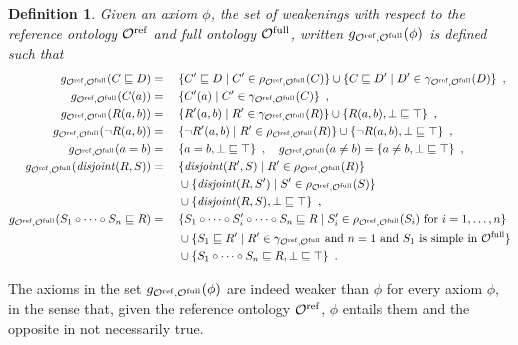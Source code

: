 \documentclass[
]{ceurart}
\newtheorem{definition}{Definition}
\newtheorem{example}{Example}
\begin{document}
\begin{definition}
  Given an axiom $\phi$, the set of \emph{weakenings} with respect to the reference ontology ${\mathcal{O}^\textnormal{ref}}$ and full ontology ${\mathcal{O}^\textnormal{full}}$, written $g_{{\mathcal{O}^\textnormal{ref}},{\mathcal{O}^\textnormal{full}}}(\phi)$ is defined such that
  \begin{alignat*}{2}
    g_{{\mathcal{O}^\textnormal{ref}},{\mathcal{O}^\textnormal{full}}}(C \sqsubseteq D) &={} &&\{ C' \sqsubseteq D \mid C' \in \rho_{{\mathcal{O}^\textnormal{ref}},{\mathcal{O}^\textnormal{full}}} (C) \} \cup \{ C \sqsubseteq D' \mid D' \in \gamma_{{\mathcal{O}^\textnormal{ref}},{\mathcal{O}^\textnormal{full}}}(D) \} \enspace, \\
    g_{{\mathcal{O}^\textnormal{ref}},{\mathcal{O}^\textnormal{full}}}(C(a)) &={} && \{ C'(a) \mid C' \in \gamma_{{\mathcal{O}^\textnormal{ref}},{\mathcal{O}^\textnormal{full}}}(C) \} \enspace, \\
    g_{{\mathcal{O}^\textnormal{ref}},{\mathcal{O}^\textnormal{full}}}(R(a, b)) &={} && \{ R'(a, b) \mid R' \in \gamma_{{\mathcal{O}^\textnormal{ref}},{\mathcal{O}^\textnormal{full}}}(R) \} \cup \{ R(a, b), \bot \sqsubseteq \top \} \enspace, \\
    g_{{\mathcal{O}^\textnormal{ref}},{\mathcal{O}^\textnormal{full}}}(\lnot R(a, b)) &={} && \{ \lnot R'(a, b) \mid R' \in \rho_{{\mathcal{O}^\textnormal{ref}},{\mathcal{O}^\textnormal{full}}}(R) \} \cup \{ \lnot R(a, b), \bot \sqsubseteq \top \} \enspace, \\
    g_{{\mathcal{O}^\textnormal{ref}},{\mathcal{O}^\textnormal{full}}}(a = b) &={} && \{ a = b, \bot \sqsubseteq \top \} \enspace,
    \quad g_{{\mathcal{O}^\textnormal{ref}},{\mathcal{O}^\textnormal{full}}}(a \not= b) = \{ a \not= b, \bot \sqsubseteq \top \} \enspace, \\
    g_{{\mathcal{O}^\textnormal{ref}},{\mathcal{O}^\textnormal{full}}}(\mathit{disjoint}(R, S)) &={} &&\{ \mathit{disjoint}(R', S) \mid R' \in \rho_{{\mathcal{O}^\textnormal{ref}},{\mathcal{O}^\textnormal{full}}} (R) \} \\
    &&& \cup \{ \mathit{disjoint}(R, S') \mid S' \in \rho_{{\mathcal{O}^\textnormal{ref}},{\mathcal{O}^\textnormal{full}}}(S) \} \\
    &&& \cup \{ \mathit{disjoint} (R, S), \bot \sqsubseteq \top \} \enspace, \\
    g_{{\mathcal{O}^\textnormal{ref}},{\mathcal{O}^\textnormal{full}}}(S_1 \circ \cdots \circ S_n \sqsubseteq R) &={} && \{ S_1 \circ \cdots \circ S_i' \circ \cdots \circ S_n \sqsubseteq R \mid S_i' \in \rho_{{\mathcal{O}^\textnormal{ref}},{\mathcal{O}^\textnormal{full}}}(S_i) \text{ for } i = 1, \dots, n \} \\
    &&& \cup \{ S_1 \sqsubseteq R' \mid R' \in \gamma_{{\mathcal{O}^\textnormal{ref}},{\mathcal{O}^\textnormal{full}}} \text{ and } n = 1 \text{ and } S_1 \text{ is simple in } {\mathcal{O}^\textnormal{full}} \} \\
    &&& \cup \{ S_1 \circ \cdots \circ S_n \sqsubseteq R, \bot \sqsubseteq \top \} \enspace.
  \end{alignat*}
\end{definition}


The axioms in the set $g_{{\mathcal{O}^\textnormal{ref}},{\mathcal{O}^\textnormal{full}}}(\phi)$ are indeed weaker than $\phi$ for every axiom $\phi$, in the sense that, given the reference ontology ${\mathcal{O}^\textnormal{ref}}$, $\phi$ entails them and the opposite in not necessarily true.
\end{document}
